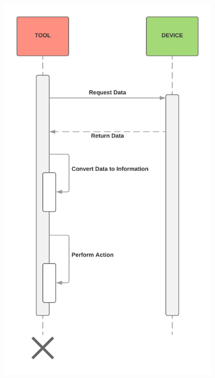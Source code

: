 \begin{figure}[h]
\begin{minipage}{0.5\textwidth}
	\includegraphics[width=\textwidth]{gfx/general_tool_logic_flow}
\end{minipage}
\end{figure}

